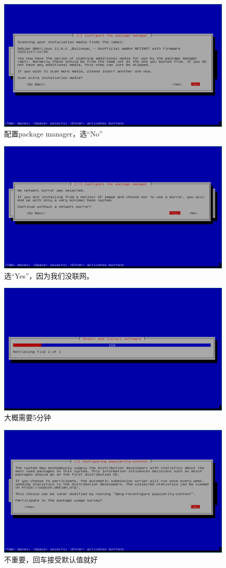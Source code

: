 \documentclass{wx672ctexart} \usepackage{hyperref}
\begin{document}
\begin{enumerate}
\begin{figure}[htbp]
\centering
\includegraphics[width=.5\linewidth]{screenshots/21.png}
\caption{配置package manager，选“No”}
\end{figure}

\begin{figure}[htbp]
\centering
\includegraphics[width=.5\linewidth]{screenshots/22.png}
\caption{选“Yes”，因为我们没联网。}
\end{figure}

\begin{figure}[htbp]
\centering
\includegraphics[width=.5\linewidth]{screenshots/23.png}
\caption{大概需要5分钟}
\end{figure}

\begin{figure}[htbp]
\centering
\includegraphics[width=.5\linewidth]{screenshots/24.png}
\caption{不重要，回车接受默认值就好}
\end{figure}


\end{enumerate}
\end{document}

